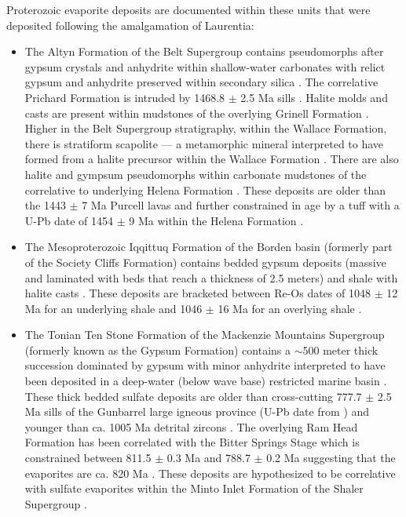\documentclass[twocolumn, switch]{article} %
\begin{document}
Proterozoic evaporite deposits are documented within these units that were deposited following the amalgamation of Laurentia: 
\begin{itemize}
\item The Altyn Formation of the Belt Supergroup contains pseudomorphs after gypsum crystals and anhydrite within shallow-water carbonates with relict gypsum and anhydrite preserved within secondary silica \citep{White1984a}. The correlative Prichard Formation is intruded by 1468.8 $\pm$ 2.5 Ma sills \citep{Sears1998a}. Halite molds and casts are present within mudstones of the overlying Grinell Formation \citep{Pratt2019a}. Higher in the Belt Supergroup stratigraphy, within the Wallace Formation, there is stratiform scapolite --- a metamorphic mineral interpreted to have formed from a halite precursor within the Wallace Formation \citep{Hietanen1967a}. There are also halite and gympsum pseudomorphs within carbonate mudstones of the correlative to underlying Helena Formation \citep{Pratt2001a,Winston2007a}.  These deposits are older than the 1443 $\pm$ 7 Ma Purcell lavas and further constrained in age by a tuff with a U-Pb date of 1454 $\pm$ 9 Ma within the Helena Formation \citep{Evans2000c}. 
\item The Mesoproterozoic Iqqittuq Formation of the Borden basin (formerly part of the Society Cliffs Formation) contains bedded gypsum deposits (massive and laminated with beds that reach a thickness of 2.5 meters) and shale with halite casts \citep{Kah2001a}.  These deposits are bracketed between Re-Os dates of 1048 $\pm$ 12 Ma for an underlying shale and 1046 $\pm$ 16 Ma for an overlying shale \citep{Gibson2018a}.
\item The Tonian Ten Stone Formation of the Mackenzie Mountains Supergroup (formerly known as the Gypsum Formation) contains a $\sim$500 meter thick succession dominated by gypsum with minor anhydrite interpreted to have been deposited in a deep-water (below wave base) restricted marine basin \citep{Turner2016a} . These thick bedded sulfate deposits are older than cross-cutting 777.7 $\pm$ 2.5 Ma sills of the Gunbarrel large igneous province (U-Pb date from \citealp{Jefferson1989a}) and younger than ca. 1005 Ma detrital zircons \citep{Turner2016a}. The overlying Ram Head Formation has been correlated with the Bitter Springs Stage which is constrained between 811.5 $\pm$ 0.3 Ma and 788.7 $\pm$ 0.2 Ma \citep{Macdonald2010a, Swanson-Hysell2015a} suggesting that the evaporites are ca. 820 Ma \citep{Turner2016a}. These deposits are hypothesized to be correlative with sulfate evaporites within the Minto Inlet Formation of the Shaler Supergroup \citep{Jones2010a, Turner2016a}.

\end{itemize}
\end{document}
